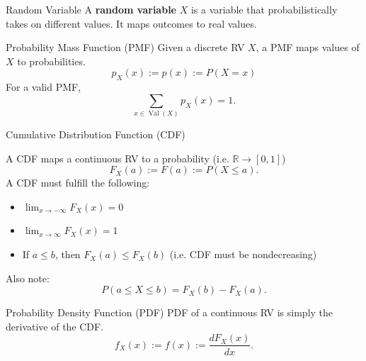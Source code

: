 \documentclass[aspectratio=169,12pt]{beamer}
\DeclareMathOperator{\Val}{Val}
\begin{document}
\begin{frame}[t]{Random Variable}
  \vspace{1.08cm}
  {\large
  A \textbf{random variable} $X$ is a variable that probabilistically takes on
  different values. It maps outcomes to real values.
  }
\end{frame}

\begin{frame}[t]{Probability Mass Function (PMF)}
  \vspace{0.95cm}
  {\large
  Given a discrete RV $X$, a PMF maps values of $X$ to probabilities.
  \[
    p_X(x):=p(x):=P(X=x)
  \]
  For a valid PMF,
  \[
    \sum_{x\in\Val(X)}p_X(x)=1.
  \]
  }
\end{frame}

\begin{frame}[t]{Cumulative Distribution Function (CDF)}
  \vspace{0.02cm}
  {\small
  A CDF maps a continuous RV to a probability (i.e. $\mathbb{R}\to[0,1]$)
  \[
    F_X(a):=F(a):=P(X\le a).
  \]
  A CDF must fulfill the following:
  \begin{itemize}
    \setlength{\itemsep}{0.14cm}
    \item $\lim_{x\to-\infty}F_X(x)=0$
    \item $\lim_{x\to\infty}F_X(x)=1$
    \item If $a\le b$, then $F_X(a)\le F_X(b)$ (i.e. CDF must be nondecreasing)
  \end{itemize}
  Also note:
  \[
    P(a\le X\le b)=F_X(b)-F_X(a).
  \]
  }
\end{frame}

\begin{frame}[t]{Probability Density Function (PDF)}
  \vspace{1.15cm}
  {\large
  PDF of a continuous RV is simply the derivative of the CDF.
  \[
    f_X(x):=f(x):=\frac{dF_X(x)}{dx}.
  \]
  }
\end{frame}
\end{document}
